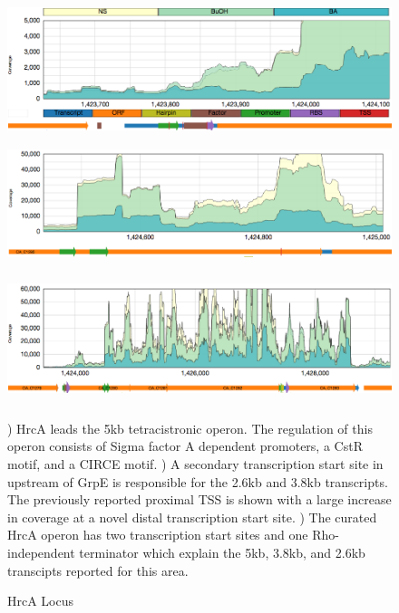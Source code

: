 \begin{figure}
{\includegraphics[width=\textwidth,height=1.5in]{images/Assembly/Examples/HrcA/HrcA-TSS.png}
\label{fig:8a}}
{\includegraphics[width=\textwidth,height=1.5in]{images/Assembly/Examples/HrcA/GrpE-TSS.png}
\label{fig:8b}}
{\includegraphics[width=\textwidth,height=1.5in]{images/Assembly/Examples/HrcA/HrcA-operon-curated.png}
\label{fig:8c}}
\caption{HrcA Locus}
) HrcA leads the 5kb tetracistronic operon. The regulation of this operon consists of Sigma factor A dependent promoters, a CstR motif, and a CIRCE motif. ) A secondary transcription start site in upstream of GrpE is responsible for the 2.6kb and 3.8kb transcripts. The previously reported proximal TSS is shown with a large increase in coverage at a novel distal transcription start site. ) The curated HrcA operon has two transcription start sites and one Rho-independent terminator which explain the 5kb, 3.8kb, and 2.6kb transcipts reported for this area.
\end{figure}


